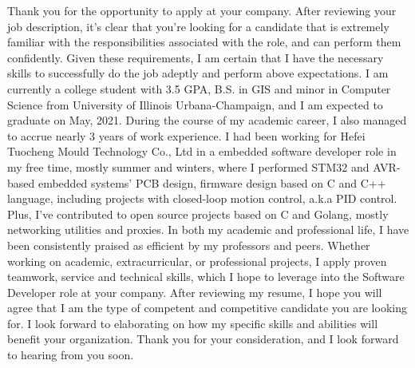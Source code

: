 \documentclass{resume}
\begin{document}



\LARGE
Thank you for the opportunity to apply at your company. After reviewing your job description, it’s clear that you’re looking for a candidate that is extremely familiar with the responsibilities associated with the role, and can perform them confidently. Given these requirements, I am certain that I have the necessary skills to successfully do the job adeptly and perform above expectations.
\newline
\newline
I am currently a college student with 3.5 GPA, B.S. in GIS and minor in Computer Science from University of Illinois Urbana-Champaign, and I am expected to graduate on May, 2021. During the course of my academic career, I also managed to accrue nearly 3 years of work experience. I had been working for Hefei Tuocheng Mould Technology Co., Ltd in a embedded software developer role in my free time, mostly summer and winters, where I performed STM32 and AVR-based embedded systems' PCB design, firmware design based on C and C++ language, including projects with closed-loop motion control, a.k.a PID control. Plus, I've contributed to open source projects based on C and Golang, mostly networking utilities and proxies. In both my academic and professional life, I have been consistently praised as efficient by my professors and peers. Whether working on academic, extracurricular, or professional projects, I apply proven teamwork, service and technical skills, which I hope to leverage into the Software Developer role at your company.
\newline
\newline
After reviewing my resume, I hope you will agree that I am the type of competent and competitive candidate you are looking for. I look forward to elaborating on how my specific skills and abilities will benefit your organization.
\newline
\newline
Thank you for your consideration, and I look forward to hearing from you soon.
\end{document}
